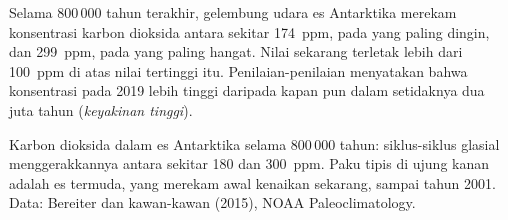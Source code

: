 \begin{proposition}\label{prop:g12:climate-change:icecore}
Selama 800\,000 tahun terakhir, gelembung udara es Antarktika merekam
konsentrasi karbon dioksida antara sekitar \qty{174}{ppm}, pada 
yang paling dingin, dan \qty{299}{ppm}, pada  yang paling hangat.
Nilai sekarang terletak lebih dari \qty{100}{ppm} di atas nilai tertinggi itu.
Penilaian-penilaian menyatakan bahwa konsentrasi pada 2019 lebih tinggi
daripada kapan pun dalam setidaknya dua juta tahun (\emph{keyakinan tinggi}).
\end{proposition}

\begin{omfigure}

{\small Karbon dioksida dalam es Antarktika selama 800\,000 tahun: siklus-siklus
glasial menggerakkannya antara sekitar 180 dan \qty{300}{ppm}. Paku tipis di
ujung kanan adalah es termuda, yang merekam awal kenaikan sekarang, sampai
tahun 2001. Data: Bereiter dan kawan-kawan (2015), NOAA Paleoclimatology.}
\end{omfigure}

